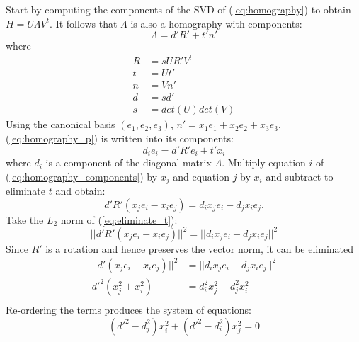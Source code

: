 \documentclass{article}
\begin{document}
Start by computing the components of the SVD of (\ref {eq:homography}) to obtain $H = U \Lambda V^t$. It follows that $\Lambda$ is also a homography with components:
%
\begin {equation} \label {eq:homography_p}
\Lambda = d' R' + t' n'
\end {equation}
%
where
%
\begin {equation}
\begin {aligned}
R &= s U R' V^t \\
t &= U t' \\
n &= V n' \\
d &= s d' \\
s &= det (U) det (V)
\end {aligned}
\end {equation}
%
Using the canonical basis $(e_1, e_2, e_3)$, $n' = x_1 e_1 + x_2 e_2 + x_3 e_3$, (\ref {eq:homography_p}) is written into its components:
%
\begin {equation} \label {eq:homography_components}
d_i e_i = d' R' e_i + t' x_i
\end {equation}
%
where $d_i$ is a component of the diagonal matrix $\Lambda$.
Multiply equation $i$ of (\ref {eq:homography_components}) by $x_j$ and equation $j$ by $x_i$ and subtract to eliminate $t$ and obtain:
%
\begin {equation} \label {eq:eliminate_t}
d' R' (x_j e_i - x_i e_j) = d_i x_j e_i - d_j x_i e_j.
\end {equation}
%
Take the $L_2$ norm of (\ref {eq:eliminate_t}):
%
\begin {equation}
||d' R' (x_j e_i - x_i e_j)||^2 = ||d_i x_j e_i - d_j x_i e_j||^2
\end {equation}
%
Since $R'$ is a rotation and hence preserves the vector norm, it can be eliminated
%
\begin {equation}
\begin {aligned}
||d' (x_j e_i - x_i e_j)||^2 &= ||d_i x_j e_i - d_j x_i e_j||^2 \\
d'^2 (x_j^2 + x_i^2) &= d_i^2 x_j^2 + d_j^2 x_i^2 \\
\end {aligned}
\end {equation}
%
Re-ordering the terms produces the system of equations:
%
\begin {equation}
(d'^2 - d_j^2) x_i^2 + (d'^2 - d_i^2) x_j^2 = 0
\end {equation}
%
\end{document}
